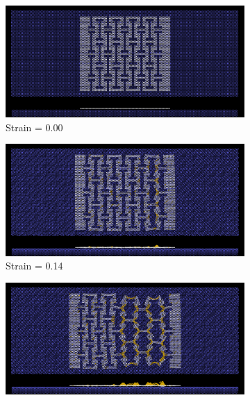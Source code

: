 \begin{figure}[H]
    \centering
    \begin{subfigure}[b]{0.49\textwidth}
        \centering
        \includegraphics[width=\textwidth]{figures/baseline/contact_vs_stretch/honeycomb/hon_stretch0000.png}
        \caption{Strain = 0.00}
    \end{subfigure}
    \hfill
    \begin{subfigure}[b]{0.49\textwidth}
        \centering
        \includegraphics[width=\textwidth]{figures/baseline/contact_vs_stretch/honeycomb/hon_stretch0014.png}
        \caption{Strain = 0.14}
    \end{subfigure}
    \begin{subfigure}[b]{0.49\textwidth}
        \centering
        \includegraphics[width=\textwidth]{figures/baseline/contact_vs_stretch/honeycomb/hon_stretch0028.png}

\end{subfigure}
\end{figure}
